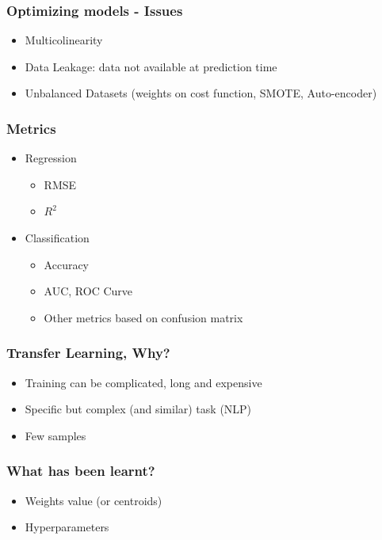 \begin{frame}\frametitle{Optimizing models - Issues}
   \begin{itemize}
      \item Multicolinearity
      \item Data Leakage: data not available at prediction time
      \item Unbalanced Datasets (weights on cost function, SMOTE, Auto-encoder)
   \end{itemize}
\end{frame}


\begin{frame}\frametitle{Metrics}
   \begin{itemize}
      \item Regression
      \begin{itemize}
         \item RMSE
         \item $R^2$
      \end{itemize}

      \item Classification
      \begin{itemize}
         \item Accuracy
         \item AUC, ROC Curve
         \item Other metrics based on confusion matrix
      \end{itemize}
   \end{itemize}
\end{frame}


\begin{frame}\frametitle{Transfer Learning, Why?}
   \begin{itemize}
      \item Training can be complicated, long and expensive
      \item Specific but complex (and similar) task (NLP)
      \item Few samples
   \end{itemize}
\end{frame}

\begin{frame}\frametitle{What has been learnt?}
   \begin{itemize}
      \item Weights value (or centroids)
      \item Hyperparameters
   \end{itemize}
\end{frame}



